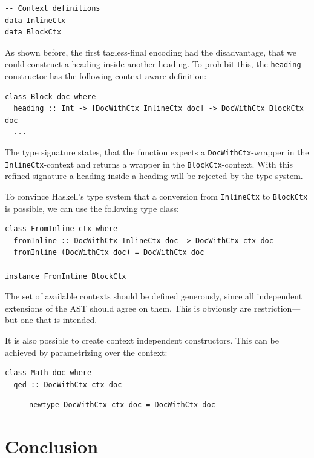 \begin{lstlisting}
-- Context definitions
data InlineCtx
data BlockCtx
\end{lstlisting}

As shown before, the first tagless-final encoding had the disadvantage, that we
could construct a heading inside another heading. To prohibit this, the
\texttt{heading} constructor has the following context-aware definition:

\begin{lstlisting}
class Block doc where
  heading :: Int -> [DocWithCtx InlineCtx doc] -> DocWithCtx BlockCtx doc
  ...
\end{lstlisting}

The type signature states, that the function expects a
\texttt{DocWithCtx}-wrapper in the \texttt{InlineCtx}-context and returns a
wrapper in the \texttt{BlockCtx}-context. With this refined signature a heading
inside a heading will be rejected by the type system.

To convince Haskell’s type system that a conversion from \texttt{InlineCtx} to
\texttt{BlockCtx} is possible, we can use the following type class:

\begin{lstlisting}
class FromInline ctx where
  fromInline :: DocWithCtx InlineCtx doc -> DocWithCtx ctx doc
  fromInline (DocWithCtx doc) = DocWithCtx doc

instance FromInline BlockCtx
\end{lstlisting}


The set of available contexts should be defined generously, since all
independent extensions of the AST should agree on them. This is obviously are
restriction—but one that is intended.

It is also possible to create context independent constructors. This can be
achieved by parametrizing over the context:

\begin{lstlisting}
class Math doc where
  qed :: DocWithCtx ctx doc
\end{lstlisting}

\begin{figure}[t]
\begin{lstlisting}
newtype DocWithCtx ctx doc = DocWithCtx doc
\end{lstlisting}
\end{figure}

\section{Conclusion}

